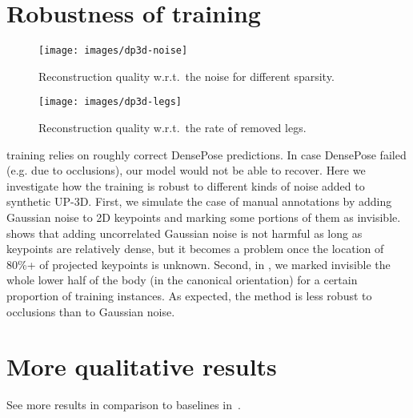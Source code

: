 \section{Robustness of training}

\begin{figure}[tb]
  \texttt{[image: images/dp3d-noise]}\vspace{-3ex}%
  \caption{%
  Reconstruction quality w.r.t.~the noise for different sparsity.%
  }
  \label{f:dp3dnoise}
\end{figure}

\begin{figure}[tb]
  \texttt{[image: images/dp3d-legs]}\vspace{-3ex}%
  \caption{%
  Reconstruction quality w.r.t.~the rate of removed legs.%
  }
  \label{f:dp3d-legs}
\end{figure}

\method training relies on roughly correct DensePose predictions. In case DensePose failed (e.g. due to occlusions), our model would not be able to recover.
Here we investigate how the training is robust to different kinds of noise added to synthetic UP-3D. First, we simulate the case of manual annotations by adding Gaussian noise to 2D keypoints and marking some portions of them as invisible.  shows that adding uncorrelated Gaussian noise is not harmful as long as keypoints are relatively dense, but it becomes a problem once the location of 80\%+ of projected keypoints is unknown. Second, in , we marked invisible the whole lower half of the body (in the canonical orientation) for a certain proportion of training instances. As expected, the method is less robust to occlusions than to Gaussian noise.

\section{More qualitative results}

See more results in comparison to baselines in~.









